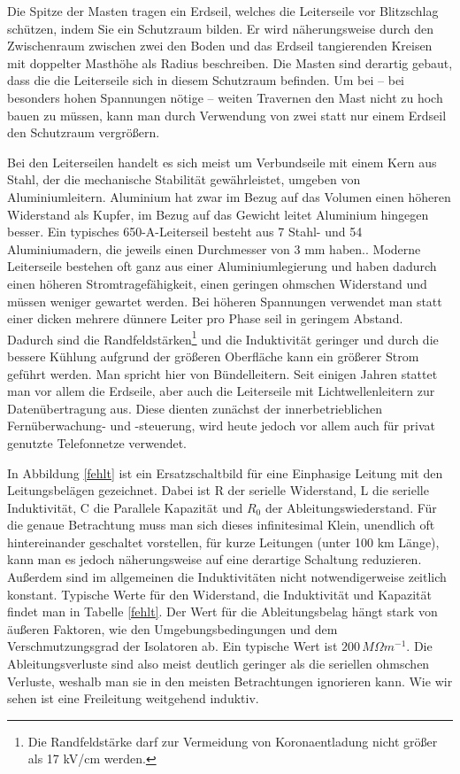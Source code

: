 \documentclass[10pt,a4paper]{article}
\begin{document}
Die Spitze der Masten tragen ein Erdseil, welches die Leiterseile vor Blitzschlag schützen, indem Sie ein Schutzraum bilden. Er wird näherungsweise durch den Zwischenraum zwischen zwei den Boden und das Erdseil tangierenden Kreisen mit doppelter Masthöhe als Radius beschreiben. Die Masten sind derartig gebaut, dass die die Leiterseile sich in diesem Schutzraum befinden. Um bei – bei besonders hohen Spannungen nötige – weiten Travernen den Mast nicht zu hoch bauen zu müssen, kann man durch Verwendung von zwei statt nur einem Erdseil den Schutzraum vergrößern.

Bei den Leiterseilen handelt es sich meist um Verbundseile mit einem Kern aus Stahl, der die mechanische Stabilität gewährleistet, umgeben von Aluminiumleitern. Aluminium hat zwar im Bezug auf das Volumen einen höheren Widerstand als Kupfer, im Bezug auf das Gewicht leitet Aluminium hingegen besser. Ein typisches 650-A-Leiterseil besteht aus 7 Stahl- und 54 Aluminiumadern, die jeweils einen Durchmesser von 3 mm haben.\cite{Harrison}.
Moderne Leiterseile bestehen oft ganz aus einer Aluminiumlegierung und haben dadurch einen höheren Stromtragefähigkeit, einen geringen ohmschen Widerstand und müssen weniger gewartet werden\cite{Harrison}.
Bei höheren Spannungen verwendet man statt einer dicken mehrere dünnere Leiter pro Phase seil in geringem Abstand. Dadurch sind die Randfeldstärken\footnote{Die Randfeldstärke darf zur Vermeidung von Koronaentladung nicht größer als 17 kV/cm werden.\cite{Flosdorff}} und die Induktivität geringer und durch die bessere Kühlung aufgrund der größeren Oberfläche kann ein größerer Strom geführt werden. Man spricht hier von Bündelleitern.
Seit einigen Jahren stattet man vor allem die Erdseile, aber auch die Leiterseile mit Lichtwellenleitern zur Datenübertragung aus. Diese dienten zunächst der innerbetrieblichen Fernüberwachung- und -steuerung, wird heute jedoch vor allem auch für privat genutzte Telefonnetze verwendet.\cite{Flosdorff}

In Abbildung \ref{fehlt} ist ein Ersatzschaltbild für eine Einphasige Leitung mit den Leitungsbelägen gezeichnet.
Dabei ist R der serielle Widerstand, L die serielle Induktivität, C die Parallele Kapazität und $R_0$ der Ableitungswiederstand. Für die genaue Betrachtung muss man sich dieses infinitesimal Klein, unendlich oft hintereinander geschaltet vorstellen, für kurze Leitungen (unter 100 km Länge), kann man es jedoch näherungsweise auf eine derartige Schaltung reduzieren. Außerdem sind im allgemeinen die Induktivitäten nicht notwendigerweise zeitlich konstant.\cite{Flosdorff}
Typische Werte für den Widerstand, die Induktivität und Kapazität findet man in Tabelle \ref{fehlt}. Der Wert für die Ableitungsbelag hängt stark von äußeren Faktoren, wie den Umgebungsbedingungen und dem Verschmutzungsgrad der Isolatoren ab. Ein typische Wert ist $200\,M\Omega m^{-1}$.\cite{Harrison} Die Ableitungsverluste sind also meist deutlich geringer als die seriellen ohmschen Verluste, weshalb man sie in den meisten Betrachtungen ignorieren kann. Wie wir sehen ist eine Freileitung weitgehend induktiv.
\end{document}

